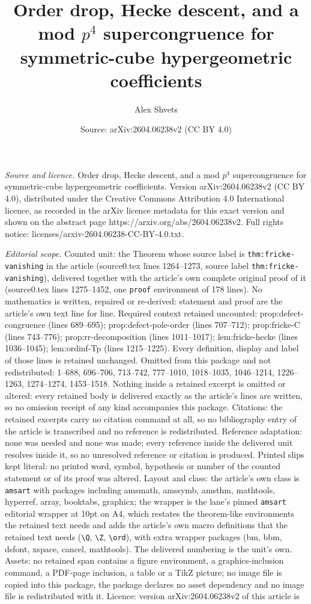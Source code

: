 \documentclass[10pt,a4paper]{amsart}
\title[Order drop, Hecke descent, and a mod $p^4$ supercongruence f]{Order drop, Hecke descent, and a mod $p^4$ supercongruence for symmetric-cube hypergeometric coefficients}
\author{Alex Shvets}
\date{Source: arXiv:2604.06238v2 (CC BY 4.0)}
\begin{document}
\maketitle

\noindent\emph{Source and licence.} Order drop, Hecke descent, and a mod $p^4$ supercongruence for symmetric-cube hypergeometric coefficients. Version arXiv:2604.06238v2 (CC BY 4.0), distributed under the Creative Commons Attribution 4.0 International licence, as recorded in the arXiv licence metadata for this exact version and shown on the abstract page https://arxiv.org/abs/2604.06238v2. Full rights notice: licenses/arxiv-2604.06238-CC-BY-4.0.txt.\par\smallskip

\noindent\textit{Editorial scope.} Counted unit: the Theorem whose source label is \texttt{thm:fricke-vanishing} in the article (source0.tex lines 1264--1273, source label \texttt{thm:fricke-vanishing}), delivered together with the article's own complete original proof of it (source0.tex lines 1275--1452, one \texttt{proof} environment of 178 lines). No mathematics is written, repaired or re-derived: statement and proof are the article's own text line for line. Required context retained uncounted: prop:defect-congruence (lines 689--695); prop:defect-pole-order (lines 707--712); prop:fricke-C (lines 743--776); prop:rr-decomposition (lines 1011--1017); lem:fricke-hecke (lines 1036--1045); lem:ordinf-Tp (lines 1215--1225). Every definition, display and label of those lines is retained unchanged. Omitted from this package and not redistributed: 1--688, 696--706, 713--742, 777--1010, 1018--1035, 1046--1214, 1226--1263, 1274--1274, 1453--1518. Nothing inside a retained excerpt is omitted or altered: every retained body is delivered exactly as the article's lines are written, so no omission receipt of any kind accompanies this package. Citations: the retained excerpts carry no citation command at all, so no bibliography entry of the article is transcribed and no reference is redistributed. Reference adaptation: none was needed and none was made; every reference inside the delivered unit resolves inside it, so no unresolved reference or citation is produced. Printed slips kept literal: no printed word, symbol, hypothesis or number of the counted statement or of its proof was altered. Layout and class: the article's own class is \texttt{amsart} with packages including amsmath, amssymb, amsthm, mathtools, hyperref, array, booktabs, graphicx; the wrapper is the lane's pinned \texttt{amsart} editorial wrapper at 10pt on A4, which restates the theorem-like environments the retained text needs and adds the article's own macro definitions that the retained text needs (\texttt{\textbackslash Q}, \texttt{\textbackslash Z}, \texttt{\textbackslash ord}), with extra wrapper packages (bm, bbm, dsfont, xspace, cancel, mathtools). The delivered numbering is the unit's own. Assets: no retained span contains a figure environment, a graphics-inclusion command, a PDF-page inclusion, a table or a TikZ picture; no image file is copied into this package, the package declares no asset dependency and no image file is redistributed with it. Licence: version arXiv:2604.06238v2 of this article is 
\end{document}
